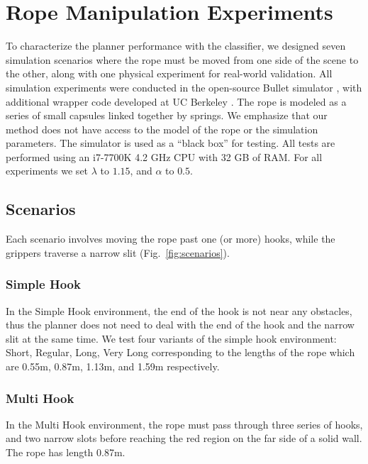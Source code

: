 

\section{Rope Manipulation Experiments}


To characterize the planner performance with the classifier, we designed seven simulation scenarios where the rope must be moved from one side of the scene to the other, along with one physical experiment for real-world validation.
All simulation experiments were conducted in the open-source Bullet simulator \cite{Coumans2010}, with additional wrapper code developed at UC Berkeley \cite{ucberkley_bullet}. The rope is modeled as a series of small capsules linked together by springs. We emphasize that our method does not have access to the model of the rope or the simulation parameters. The simulator is used as a ``black box'' for testing. All tests are performed using an i7-7700K 4.2 GHz CPU with 32 GB of RAM. For all experiments we set $\lambda$ to $1.15$, and $\alpha$ to $0.5$.



\subsection{Scenarios}


Each scenario involves moving the rope past one (or more) hooks, while the grippers traverse a narrow slit (Fig.~\ref{fig:scenarios}).

\subsubsection{Simple Hook}

In the Simple Hook environment, the end of the hook is not near any obstacles, thus the planner does not need to deal with the end of the hook and the narrow slit at the same time. We test four variants of the simple hook environment: Short, Regular, Long, Very Long corresponding to the lengths of the rope which are 0.55m, 0.87m, 1.13m, and 1.59m respectively.

\subsubsection{Multi Hook}

In the Multi Hook environment, the rope must pass through three series of hooks, and two narrow slots before reaching the red region on the far side of a solid wall. The rope has length 0.87m.

